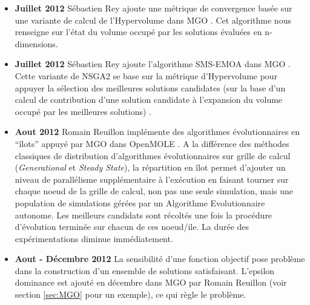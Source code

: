 \begin{itemize}[label=\textbullet]
\item {\textbf{Juillet 2012}} Sébastien Rey ajoute une métrique de convergence basée sur une variante de calcul de l'Hypervolume dans MGO \autocite{Fonseca2006}. Cet algorithme nous renseigne sur l'état du volume occupé par les solutions évaluées en n-dimensions.

\item {\textbf{Juillet 2012}} Sébastien Rey ajoute l'algorithme SMS-EMOA dans MGO \autocite{Emmerich2005}. Cette variante de NSGA2 se base sur la métrique d'Hypervolume pour appuyer la sélection des meilleures solutions candidates (sur la base d'un calcul de contribution d'une solution candidate à l'expansion du volume occupé par les meilleures solutions) .

\item {\textbf{Aout 2012}} Romain Reuillon implémente des algorithmes évolutionnaires en \enquote{îlots} appuyé par MGO dans OpenMOLE \autocite{Whitley1997}. A la différence des méthodes classiques de distribution d'algorithmes évolutionnaires sur grille de calcul (\textit{Generational} et \textit{Steady State}), la répartition en îlot permet d'ajouter un niveau de parallélisme supplémentaire à l'exécution en faisant tourner sur chaque noeud de la grille de calcul, non pas une seule simulation, mais une population de simulations gérées par un Algorithme Evolutionnaire autonome. Les meilleurs candidats sont récoltés une fois la procédure d'évolution terminée sur chacun de ces noeud/ile. La durée des expérimentations diminue immédiatement.

\item {\textbf{Aout - Décembre 2012}} La sensibilité d'une fonction objectif pose problème dans la construction d'un ensemble de solutions satisfaisant. L'epsilon dominance est ajouté en décembre dans MGO par Romain Reuillon (voir section \ref{sec:MGO} pour un exemple), ce qui règle le problème.


\end{itemize}
